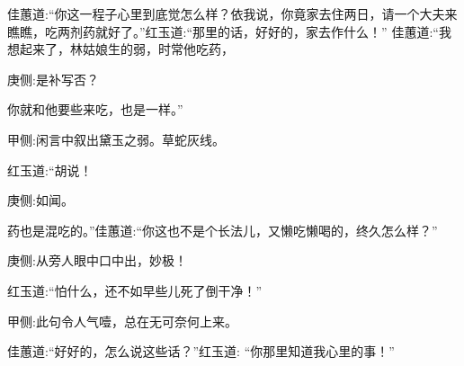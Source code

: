 \begin{parag}
    佳蕙道:“你这一程子心里到底觉怎么样？依我说，你竟家去住两日，请一个大夫来瞧瞧，吃两剂药就好了。”红玉道:“那里的话，好好的，家去作什么！” 佳蕙道:“我想起来了，林姑娘生的弱，时常他吃药，\begin{note}庚侧:是补写否？\end{note}你就和他要些来吃，也是一样。”\begin{note}甲侧:闲言中叙出黛玉之弱。草蛇灰线。\end{note}红玉道:“胡说！\begin{note}庚侧:如闻。\end{note}药也是混吃的。”佳蕙道:“你这也不是个长法儿，又懒吃懒喝的，终久怎么样？”\begin{note}庚侧:从旁人眼中口中出，妙极！\end{note}红玉道:“怕什么，还不如早些儿死了倒干净！”\begin{note}甲侧:此句令人气噎，总在无可奈何上来。\end{note}佳蕙道:“好好的，怎么说这些话？”红玉道: “你那里知道我心里的事！”
\end{parag}


